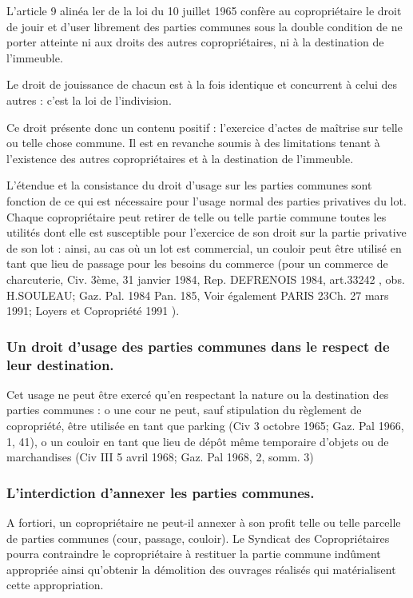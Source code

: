 		L'article 9 alinéa ler de la loi du 10 juillet 1965 confère au copropriétaire le droit de jouir et d'user librement des parties communes sous la double condition de ne porter atteinte ni aux droits des autres copropriétaires, ni à la destination de l'immeuble.
		
		Le droit de jouissance de chacun est à la fois identique et concurrent à celui des autres : c'est la loi de l'indivision.
		
		Ce droit présente donc un contenu positif : l'exercice d'actes de maîtrise sur telle ou telle chose commune. Il est en revanche soumis à des limitations tenant à l'existence des autres copropriétaires et à la destination de l'immeuble.
		
		L'étendue et la consistance du droit d'usage sur les parties communes sont fonction de ce qui est nécessaire pour l'usage normal des parties privatives du lot.
		Chaque copropriétaire peut retirer de telle ou telle partie commune toutes les utilités dont elle est susceptible pour l'exercice de son droit sur la partie privative de son lot : ainsi, au cas où un lot est commercial, un couloir peut être utilisé en tant que lieu de passage pour les besoins du commerce (pour un commerce de charcuterie, Civ. 3ème, 31 janvier 1984, Rep. DEFRENOIS 1984, art.33242 , obs. H.SOULEAU; Gaz. Pal. 1984 Pan. 185, Voir également PARIS 23\degres Ch. 27 mars 1991; Loyers et Copropriété 1991 ).
		
		\subsubsection{Un droit d'usage des parties communes dans le respect de leur destination.}
		
			Cet usage ne peut être exercé qu'en respectant la nature ou la destination des parties communes :
			o une cour ne peut, sauf stipulation du règlement de copropriété, être utilisée en tant que parking (Civ 3 octobre 1965; Gaz. Pal 1966, 1, 41),
			o un couloir en tant que lieu de dépôt même temporaire d'objets ou de marchandises (Civ III 5 avril 1968; Gaz. Pal 1968, 2, somm. 3)
		
		\subsubsection{L’interdiction d'annexer les parties communes.}
	
			A fortiori, un copropriétaire ne peut-il annexer à son profit telle ou telle parcelle de parties communes (cour, passage, couloir).
			Le Syndicat des Copropriétaires pourra contraindre le copropriétaire à restituer la partie commune indûment appropriée ainsi qu'obtenir la démolition des ouvrages réalisés qui matérialisent cette appropriation.
	
